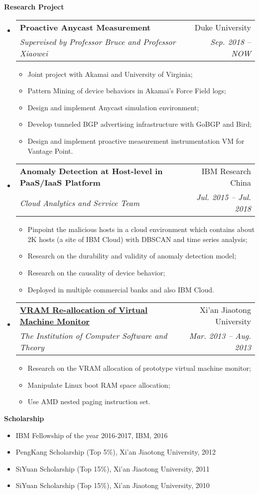 \documentclass[letterpaper,11pt]{article}
\makeatletter
\newcommand{\resitem}[1]{\item #1 \vspace{-2pt}}
\newcommand{\resheading}[1]{{\large \colorbox{mygrey}{\begin{minipage}{\textwidth}{\textbf{#1 \vphantom{p\^{E}}}}\end{minipage}}}}
\newcommand{\ressubheading}[4]{
\begin{tabular*}{6.5in}{l@{\extracolsep{\fill}}r}
		\textbf{#1} & #2 \\
		\textit{#3} & \textit{#4} \\
\end{tabular*}\vspace{-6pt}}
\makeatother
\begin{document}
\resheading{Research Project}
	\begin{itemize}
			\item 
			\ressubheading{Proactive Anycast Measurement}{Duke University}{Supervised by Professor Bruce and Professor Xiaowei}{Sep. 2018 -- NOW}
				{ \footnotesize
				\begin{itemize}
				    \resitem{Joint project with Akamai and University of Virginia;}
					\resitem{Pattern Mining of device behaviors in Akamai's Force Field logs;}
					\resitem{Design and implement Anycast simulation environment;}
					\resitem{Develop tunneled BGP advertising infrastructure with GoBGP and Bird;}
					\resitem{Design and implement proactive measurement instrumentation VM for Vantage Point.}
				\end{itemize}
				}
		\item 
			\ressubheading{Anomaly Detection at Host-level in PaaS/IaaS Platform}{IBM Research China}{Cloud Analytics and Service Team}{Jul. 2015 -- Jul. 2018}
				{ \footnotesize
				\begin{itemize}
					\resitem{Pinpoint the malicious hosts in a cloud environment which contains about 2K hosts (a site of IBM Cloud) with DBSCAN and time series analysis;}
					\resitem{Research on the durability and validity  of anomaly detection model;}
					\resitem{Research on the causality of device behavior;}
					\resitem{Deployed in multiple commercial banks and also IBM Cloud.}
				\end{itemize}
				}
		\item 
			\ressubheading{\href{http://eiegrd.xjtu.edu.cn/}{VRAM Re-allocation of Virtual Machine Monitor}}{Xi'an Jiaotong University}{The Institution of Computer Software and Theory}{Mar. 2013 -- Aug. 2013}
				{ \footnotesize
				\begin{itemize}
					\resitem{Research on the VRAM allocation of prototype virtual machine monitor;}
					\resitem{Manipulate Linux boot RAM space allocation;}
					\resitem{Use AMD nested paging instruction set.}
				\end{itemize}
				}
	\end{itemize}	

\resheading{Scholarship}
	\begin{itemize}
		\item
			IBM Fellowship of the year 2016-2017, IBM, 2016
		\item
			PengKang Scholarship (Top 5\%), Xi'an Jiaotong University, 2012
		\item
			SiYuan Scholarship (Top 15\%), Xi'an Jiaotong University, 2011
		\item
			SiYuan Scholarship (Top 15\%), Xi'an Jiaotong University, 2010
	\end{itemize}
\end{document}

